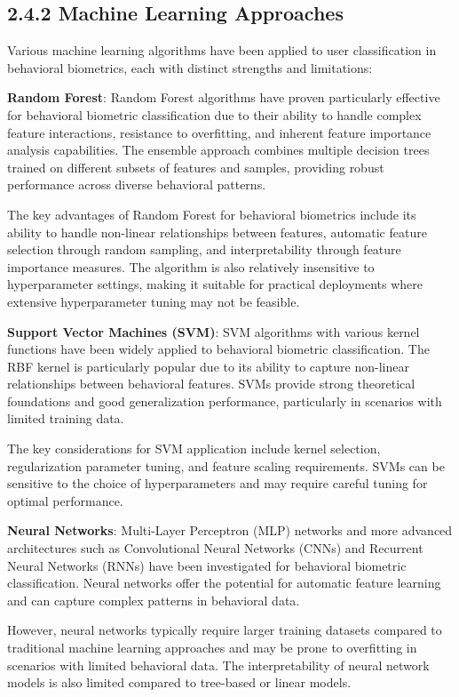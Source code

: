\documentclass[
  12pt,
  a4paper,
]{report}
\begin{document}
\subsection{2.4.2 Machine Learning
Approaches}\label{machine-learning-approaches}

Various machine learning algorithms have been applied to user
classification in behavioral biometrics, each with distinct strengths
and limitations:

\textbf{Random Forest}: Random Forest algorithms have proven
particularly effective for behavioral biometric classification due to
their ability to handle complex feature interactions, resistance to
overfitting, and inherent feature importance analysis capabilities. The
ensemble approach combines multiple decision trees trained on different
subsets of features and samples, providing robust performance across
diverse behavioral patterns.

The key advantages of Random Forest for behavioral biometrics include
its ability to handle non-linear relationships between features,
automatic feature selection through random sampling, and
interpretability through feature importance measures. The algorithm is
also relatively insensitive to hyperparameter settings, making it
suitable for practical deployments where extensive hyperparameter tuning
may not be feasible.

\textbf{Support Vector Machines (SVM)}: SVM algorithms with various
kernel functions have been widely applied to behavioral biometric
classification. The RBF kernel is particularly popular due to its
ability to capture non-linear relationships between behavioral features.
SVMs provide strong theoretical foundations and good generalization
performance, particularly in scenarios with limited training data.

The key considerations for SVM application include kernel selection,
regularization parameter tuning, and feature scaling requirements. SVMs
can be sensitive to the choice of hyperparameters and may require
careful tuning for optimal performance.

\textbf{Neural Networks}: Multi-Layer Perceptron (MLP) networks and more
advanced architectures such as Convolutional Neural Networks (CNNs) and
Recurrent Neural Networks (RNNs) have been investigated for behavioral
biometric classification. Neural networks offer the potential for
automatic feature learning and can capture complex patterns in
behavioral data.

However, neural networks typically require larger training datasets
compared to traditional machine learning approaches and may be prone to
overfitting in scenarios with limited behavioral data. The
interpretability of neural network models is also limited compared to
tree-based or linear models.
\end{document}
